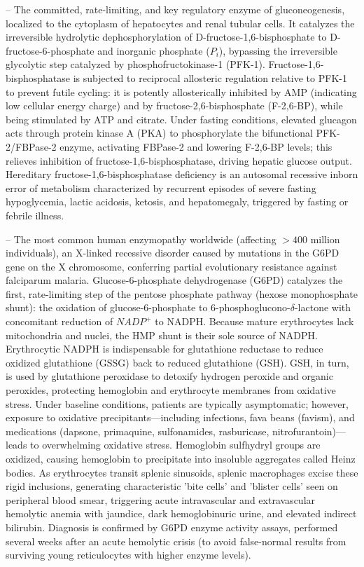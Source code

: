 -- The committed, rate-limiting, and key regulatory enzyme of gluconeogenesis, localized to the cytoplasm of hepatocytes and renal tubular cells. It catalyzes the irreversible hydrolytic dephosphorylation of D-fructose-1,6-bisphosphate to D-fructose-6-phosphate and inorganic phosphate ($P_i$), bypassing the irreversible glycolytic step catalyzed by phosphofructokinase-1 (PFK-1). Fructose-1,6-bisphosphatase is subjected to reciprocal allosteric regulation relative to PFK-1 to prevent futile cycling: it is potently allosterically inhibited by AMP (indicating low cellular energy charge) and by fructose-2,6-bisphosphate (F-2,6-BP), while being stimulated by ATP and citrate. Under fasting conditions, elevated glucagon acts through protein kinase A (PKA) to phosphorylate the bifunctional PFK-2/FBPase-2 enzyme, activating FBPase-2 and lowering F-2,6-BP levels; this relieves inhibition of fructose-1,6-bisphosphatase, driving hepatic glucose output. Hereditary fructose-1,6-bisphosphatase deficiency is an autosomal recessive inborn error of metabolism characterized by recurrent episodes of severe fasting hypoglycemia, lactic acidosis, ketosis, and hepatomegaly, triggered by fasting or febrile illness.

-- The most common human enzymopathy worldwide (affecting $>400$ million individuals), an X-linked recessive disorder caused by mutations in the G6PD gene on the X chromosome, conferring partial evolutionary resistance against falciparum malaria. Glucose-6-phosphate dehydrogenase (G6PD) catalyzes the first, rate-limiting step of the pentose phosphate pathway (hexose monophosphate shunt): the oxidation of glucose-6-phosphate to 6-phosphoglucono-$\delta$-lactone with concomitant reduction of $NADP^+$ to NADPH. Because mature erythrocytes lack mitochondria and nuclei, the HMP shunt is their sole source of NADPH. Erythrocytic NADPH is indispensable for glutathione reductase to reduce oxidized glutathione (GSSG) back to reduced glutathione (GSH). GSH, in turn, is used by glutathione peroxidase to detoxify hydrogen peroxide and organic peroxides, protecting hemoglobin and erythrocyte membranes from oxidative stress. Under baseline conditions, patients are typically asymptomatic; however, exposure to oxidative precipitants---including infections, fava beans (favism), and medications (dapsone, primaquine, sulfonamides, rasburicase, nitrofurantoin)---leads to overwhelming oxidative stress. Hemoglobin sulfhydryl groups are oxidized, causing hemoglobin to precipitate into insoluble aggregates called Heinz bodies. As erythrocytes transit splenic sinusoids, splenic macrophages excise these rigid inclusions, generating characteristic 'bite cells' and 'blister cells' seen on peripheral blood smear, triggering acute intravascular and extravascular hemolytic anemia with jaundice, dark hemoglobinuric urine, and elevated indirect bilirubin. Diagnosis is confirmed by G6PD enzyme activity assays, performed several weeks after an acute hemolytic crisis (to avoid false-normal results from surviving young reticulocytes with higher enzyme levels).

